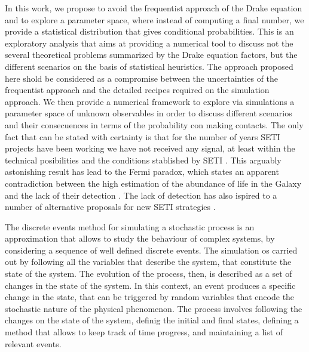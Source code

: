 \documentclass[crop]{CSLB}%
\begin{document}
%
%
%
In this work, we propose to
avoid the frequentist approach of the Drake equation and to explore a
parameter space, where instead of computing a final number, we provide
a statistical distribution that gives conditional probabilities.
%
This is an exploratory analysis that aims at providing a numerical 
tool to discuss not the several theoretical problems summarized by the
Drake equation factors, 
but the different scenarios on the basis of statistical heuristics.
%
The approach proposed here shold be considered as a compromise between
the uncertainties of the frequentist approach and the detailed recipes
required on the simulation approach.
%
We then provide a numerical framework to explore via simulations a
parameter space of unknown observables in order to discuss different
scenarios and their consecuences in terms of the probability con
making contacts.
%
The only fact that can be stated with certainty is that for the number
of years SETI projects have been working we have not received any
signal, at least
within the technical posibilities and the 
conditions stablished by SETI \citep{tarter_search_2001}.
%
This arguably astonishing result has lead to the Fermi paradox, which
states an apparent contradiction between the high estimation of the
abundance of life in the Galaxy and the lack of their detection
\citep{vanhouten_isthere_2017}.
%
The lack of detection has also ispired to a number of alternative proposals
for new SETI strategies \citep{forgan_exoplanet_2017,
balbi_impact_2018, loeb_eavesdropping_2006, maccone_KLT_2010,
tarter_advancing_2009, enriquez_breakthrough_2017, loeb_relative_2016,
maccone_SETI_2011,  lingam_relative_2019, wright_theGsearch_2015,
maccone_SETI_2013, maccone_lognormals_2014, harp_application_2018,
forgan_possibility_2013, forgan_galactic_2017, funes_searching_2019}.
 


The discrete events method for simulating a stochastic process is an
approximation that allows to study the behaviour of complex
systems, by considering a sequence of well defined discrete events.
%
The simulation os carried out by following all the variables that
describe the system, that constitute the state of the system.
%
The evolution of the process, then, is described as a set of changes
in the state of the system.
%
In this context, an event produces a specific change in the state,
that can be triggered by random variables that encode the stochastic
nature of the physical phenomenon.
%
The process involves following the changes on the state of the system,
definig the initial and final states, defining a method that allows to
keep track of time progress, and maintaining a list of relevant
events.
\end{document}
